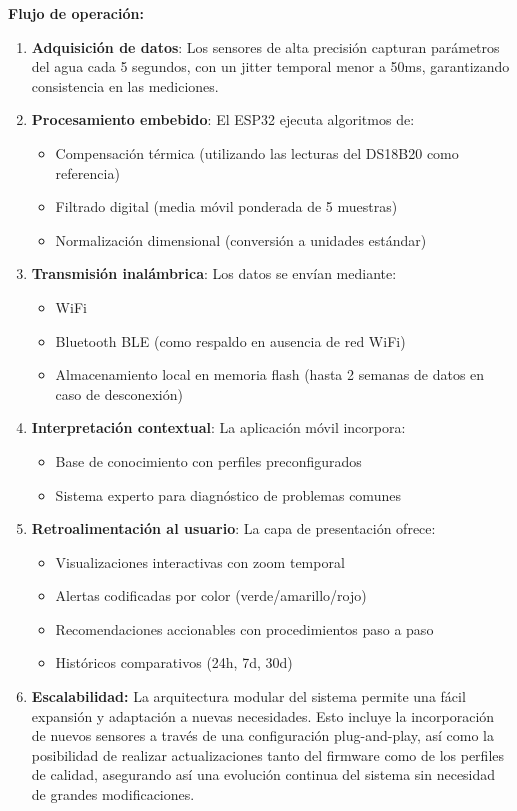 \documentclass{article}
\begin{document}
\textbf{Flujo de operación:}
\begin{enumerate}
\item \textbf{Adquisición de datos}: Los sensores de alta precisión capturan parámetros del agua cada 5 segundos, con un jitter temporal menor a 50ms, garantizando consistencia en las mediciones.

\item \textbf{Procesamiento embebido}: El ESP32 ejecuta algoritmos de:
\begin{itemize}
    \item Compensación térmica (utilizando las lecturas del DS18B20 como referencia)
    \item Filtrado digital (media móvil ponderada de 5 muestras)
    \item Normalización dimensional (conversión a unidades estándar)
\end{itemize}

\item \textbf{Transmisión inalámbrica}: Los datos se envían mediante:
\begin{itemize}
    \item WiFi
    \item Bluetooth BLE (como respaldo en ausencia de red WiFi)
    \item Almacenamiento local en memoria flash (hasta 2 semanas de datos en caso de desconexión)
    \end{itemize}

\item \textbf{Interpretación contextual}: La aplicación móvil incorpora:
\begin{itemize}
    \item Base de conocimiento con perfiles preconfigurados
    \item Sistema experto para diagnóstico de problemas comunes
\end{itemize}

\item \textbf{Retroalimentación al usuario}: La capa de presentación ofrece:
\begin{itemize}
    \item Visualizaciones interactivas con zoom temporal
    \item Alertas codificadas por color (verde/amarillo/rojo)
    \item Recomendaciones accionables con procedimientos paso a paso
    \item Históricos comparativos (24h, 7d, 30d)
\end{itemize}

\item \textbf{Escalabilidad:} 
La arquitectura modular del sistema permite una fácil expansión y adaptación a nuevas necesidades. Esto incluye la incorporación de nuevos sensores a través de una configuración plug-and-play, así como la posibilidad de realizar actualizaciones tanto del firmware como de los perfiles de calidad, asegurando así una evolución continua del sistema sin necesidad de grandes modificaciones.

\end{enumerate}
\end{document}
